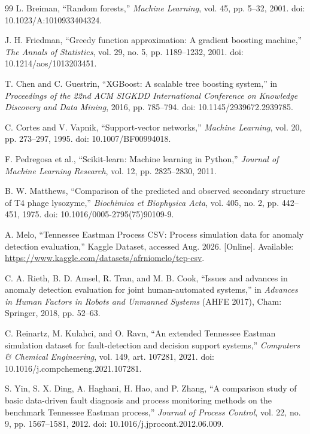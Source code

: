 \documentclass[10pt,twocolumn,a4paper]{article}
\begin{document}
\begin{thebibliography}{99}
L. Breiman, ``Random forests,'' \emph{Machine Learning}, vol. 45,
pp. 5--32, 2001. doi: 10.1023/A:1010933404324.

J. H. Friedman, ``Greedy function approximation: A gradient boosting machine,''
\emph{The Annals of Statistics}, vol. 29, no. 5, pp. 1189--1232, 2001.
doi: 10.1214/aos/1013203451.

T. Chen and C. Guestrin,
``XGBoost: A scalable tree boosting system,'' in \emph{Proceedings of the 22nd
ACM SIGKDD International Conference on Knowledge Discovery and Data Mining},
2016, pp. 785--794. doi: 10.1145/2939672.2939785.

C. Cortes and V. Vapnik, ``Support-vector networks,'' \emph{Machine Learning},
vol. 20, pp. 273--297, 1995. doi: 10.1007/BF00994018.

F. Pedregosa et al., ``Scikit-learn: Machine learning in Python,''
\emph{Journal of Machine Learning Research}, vol. 12, pp. 2825--2830, 2011.

B. W. Matthews, ``Comparison of the predicted and observed secondary structure
of T4 phage lysozyme,'' \emph{Biochimica et Biophysica Acta}, vol. 405, no. 2,
pp. 442--451, 1975. doi: 10.1016/0005-2795(75)90109-9.

A. Melo,
``Tennessee Eastman Process CSV: Process simulation data for anomaly detection
evaluation,'' Kaggle Dataset, accessed Aug. 2026. [Online]. Available:
\url{https://www.kaggle.com/datasets/afrniomelo/tep-csv}.


C. A. Rieth, B. D. Amsel, R. Tran, and M. B. Cook,
``Issues and advances in anomaly detection evaluation for joint
human-automated systems,'' in \emph{Advances in Human Factors in Robots and
Unmanned Systems} (AHFE 2017), Cham: Springer, 2018, pp. 52--63.

C. Reinartz, M. Kulahci, and O. Ravn,
``An extended Tennessee Eastman simulation dataset for fault-detection and
decision support systems,'' \emph{Computers \& Chemical Engineering}, vol. 149,
art. 107281, 2021. doi: 10.1016/j.compchemeng.2021.107281.

S. Yin, S. X. Ding, A. Haghani, H. Hao, and P. Zhang,
``A comparison study of basic data-driven fault diagnosis and process
monitoring methods on the benchmark Tennessee Eastman process,''
\emph{Journal of Process Control}, vol. 22, no. 9, pp. 1567--1581, 2012.
doi: 10.1016/j.jprocont.2012.06.009.


\end{thebibliography}
\end{document}
